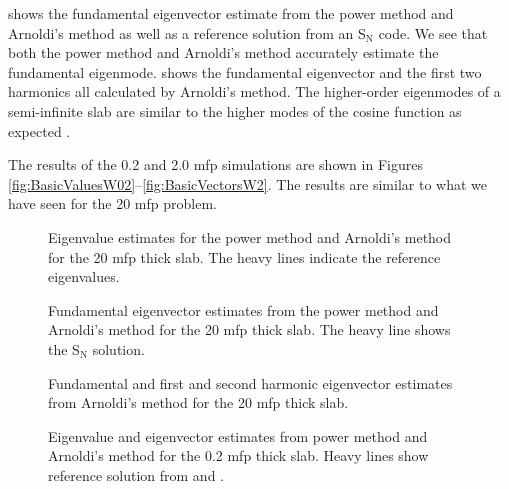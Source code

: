  shows the fundamental eigenvector estimate from the power method and Arnoldi's method as well as a reference solution from an S$_\mathrm{N}$ code.  We see that both the power method and Arnoldi's method accurately estimate the fundamental eigenmode.   shows the fundamental eigenvector and the first two harmonics all calculated by Arnoldi's method.  The higher-order eigenmodes of a semi-infinite slab are similar to the higher modes of the cosine function as expected \citep[see][pg. 173]{Duderstadt:1976Nucle-0}.  

The results of the 0.2 and 2.0 mfp simulations are shown  in Figures \ref{fig:BasicValuesW02}--\ref{fig:BasicVectorsW2}.  The results are similar to what we have seen for the 20 mfp problem.

\begin{sidewaysfigure}[hp]\centering
    
    \caption{Eigenvalue estimates for the power method and Arnoldi's method for the 20 mfp thick slab.  The heavy lines indicate the reference eigenvalues.}
    \label{fig:BasicValuesW20}
\end{sidewaysfigure}

\begin{sidewaysfigure}[hp]\centering
    
    \caption{Fundamental eigenvector estimates from the power method and Arnoldi's method for the 20 mfp thick slab.  The heavy line shows the S$_\mathrm{N}$ solution.}
    \label{fig:BasicFundamentalW20}
\end{sidewaysfigure}

\begin{sidewaysfigure}[hp]\centering
    
    \caption{Fundamental and first and second harmonic eigenvector estimates from Arnoldi's method for the 20 mfp thick slab.}
    \label{fig:BasicVectorsW20}
\end{sidewaysfigure}

\begin{figure}\centering

    \caption{Eigenvalue and eigenvector estimates from power method and Arnoldi's method for the 0.2 mfp thick slab.  Heavy lines show reference solution from \cite{Garis:1991One-s-0} and \cite{Dahl:1979Eigen-0}.}
\end{figure}

